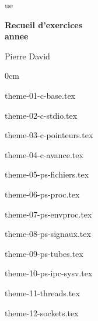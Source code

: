 \documentclass [twoside] {report}
\newcommand {\tassertoc} {{ \setlength {\parskip} {0cm} \tableofcontents }}
\newcommand {\marquerchapitre} [1]
    {
        \addcontentsline {toc} {chapter} {#1}
        \markboth {#1} {#1}
    }
\newcommand {\chapitresanstitre} [1]
    {
        \cleardoublepage
	\marquerchapitre {#1}
    }
\newcommand {\titrechapitre} [1]
    {
	\begin {center}
	    \Large \bf #1
	\end {center}
	\bigskip
	\bigskip
    }
\newcommand {\chapitre} [1]
    {
        \chapitresanstitre {#1}
        \titrechapitre {#1}
    }
\newcounter {td}
\newcounter {tp}
\newcounter {exercice} [tp]
\begin{document}
\thispagestyle {empty}

\begin {titlepage}
     {ue}

    \vfill

    \begin {center}
	\huge\bf
	Recueil d'exercices \\
	\vspace* {5mm}
	 {annee}
    \end {center}

    \vfill

    \begin {flushright}
	Pierre David
    \end {flushright}
\end {titlepage}

\cleardoublepage
\tassertoc


% 
% 
% 
% 
% 
% 
% 


 {theme-01-c-base.tex}

 {theme-02-c-stdio.tex}

 {theme-03-c-pointeurs.tex}

 {theme-04-c-avance.tex}

 {theme-05-ps-fichiers.tex}

 {theme-06-ps-proc.tex}

 {theme-07-ps-envproc.tex}

 {theme-08-ps-signaux.tex}

 {theme-09-ps-tubes.tex}

 {theme-10-ps-ipc-sysv.tex}

 {theme-11-threads.tex}

 {theme-12-sockets.tex}
\end{document}
